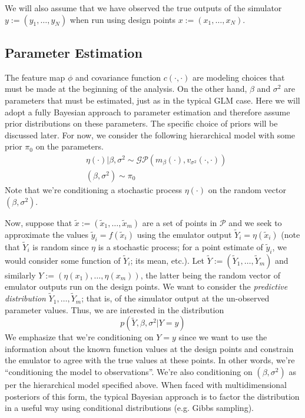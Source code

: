 \documentclass[12pt]{article}
\begin{document}
We will also assume that we have observed the true outputs of the simulator $y := (y_1, \dots, y_N)$ when run using design points $x := (x_1, \dots, x_N)$.

\subsection{Parameter Estimation}
The feature map $\phi$ and covariance function $c(\cdot, \cdot)$ are modeling choices that must be made at the beginning of the analysis. On the other hand, $\beta$ and $\sigma^2$ are parameters
that must be estimated, just as in the typical GLM case. Here we will adopt a fully Bayesian approach to parameter estimation and therefore assume prior distributions on these parameters. The specific 
choice of priors will be discussed later. For now, we consider the following hierarchical model with some prior $\pi_0$ on the parameters. 
\begin{align*}
&\eta(\cdot)|\beta, \sigma^2 \sim \mathcal{GP}(m_\beta (\cdot), v_{\sigma^2}(\cdot, \cdot)) \\
&(\beta, \sigma^2) \sim \pi_0
\end{align*}
Note that we're conditioning a stochastic process $\eta(\cdot)$ on the random vector $(\beta, \sigma^2)$. 


Now, suppose that $\tilde{x} := (\tilde{x}_1, \dots, \tilde{x}_m)$ are a set of points in $\mathcal{P}$ and we seek to approximate the values $\tilde{y}_i = f(\tilde{x}_i)$ using the 
emulator output $\tilde{Y}_i = \eta(\tilde{x}_i)$ (note that $\tilde{Y}_i$ is random since $\eta$ is a stochastic process; for a point estimate of $\tilde{y}_i$, we would consider some function of $\tilde{Y}_i$; 
its mean, etc.). Let $\tilde{Y} := (\tilde{Y}_1, \dots, \tilde{Y}_m)$ and similarly $Y := (\eta(x_1), \dots, \eta(x_m))$, the latter being the random vector of emulator outputs run on the design points. We want 
to consider the \textit{predictive distribution} $\tilde{Y}_1, \dots, \tilde{Y}_m$; that is, of the simulator output at the un-observed parameter values. Thus, we are interested 
in the distribution 
\[p(\tilde{Y}, \beta, \sigma^2|Y = y)\]
We emphasize that we're conditioning on $Y = y$ since we want to use the information about the known function values at the design points and constrain the emulator to agree with the true values 
at these points. In other words, we're ``conditioning the model to observations''. We're also conditioning on $(\beta, \sigma^2)$ as per the hierarchical model specified above. 
When faced with multidimensional posteriors of this form, the typical Bayesian approach is to factor the distribution in a 
useful way using conditional distributions (e.g. Gibbs sampling). 
\end{document}
